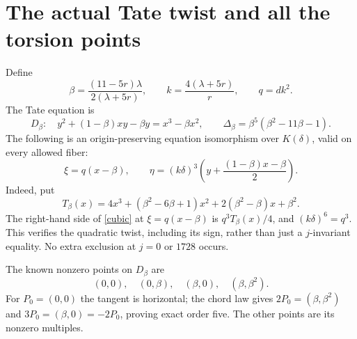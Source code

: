 \documentclass[11pt]{article}
\begin{document}
\section{The actual Tate twist and all the torsion points}
Define
\begin{equation}\label{parameters}
\beta=\frac{(11-5r)\lambda}{2(\lambda+5r)},\qquad
k=\frac{4(\lambda+5r)}r,\qquad q=dk^2.
\end{equation}
The Tate equation \cite[Lemma 1.1 and (2), p.~172]{fisher} is
\begin{equation}\label{tate}
D_\beta:\quad y^2+(1-\beta)xy-\beta y=x^3-\beta x^2,
\qquad \Delta_\beta=\beta^5(\beta^2-11\beta-1).
\end{equation}
The following is an origin-preserving equation isomorphism over
$K(\delta)$, valid on every allowed fiber:
\begin{equation}\label{tate-map}
\xi=q(x-\beta),\qquad
\eta=(k\delta)^3\left(y+\frac{(1-\beta)x-\beta}{2}\right).
\end{equation}
Indeed, put
\begin{equation}\label{branch}
T_\beta(x)=4x^3+(\beta^2-6\beta+1)x^2+2(\beta^2-\beta)x+\beta^2.
\end{equation}
The right-hand side of \eqref{cubic} at $\xi=q(x-\beta)$ is
$q^3T_\beta(x)/4$, and $(k\delta)^6=q^3$.
This verifies the quadratic twist, including its sign, rather than just
a $j$-invariant equality. No extra exclusion at $j=0$ or $1728$ occurs.

The known nonzero points on $D_\beta$ are
\begin{equation}\label{marked}
(0,0),\quad(0,\beta),\quad(\beta,0),\quad(\beta,\beta^2).
\end{equation}
For $P_0=(0,0)$ the tangent is horizontal; the chord law gives
$2P_0=(\beta,\beta^2)$ and $3P_0=(\beta,0)=-2P_0$, proving exact order
five. The other points are its nonzero multiples.
\end{document}
